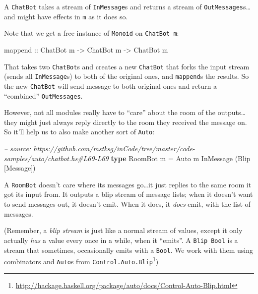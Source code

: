 \documentclass[]{article}
\newenvironment{Shaded}{\begin{snugshade}}{\end{snugshade}}
\newcommand{\CommentTok}[1]{\textcolor[rgb]{0.56,0.35,0.01}{\textit{#1}}}
\newcommand{\DataTypeTok}[1]{\textcolor[rgb]{0.13,0.29,0.53}{#1}}
\newcommand{\FunctionTok}[1]{\textcolor[rgb]{0.00,0.00,0.00}{#1}}
\newcommand{\KeywordTok}[1]{\textcolor[rgb]{0.13,0.29,0.53}{\textbf{#1}}}
\newcommand{\NormalTok}[1]{#1}
\newcommand{\OtherTok}[1]{\textcolor[rgb]{0.56,0.35,0.01}{#1}}
\renewcommand{\href}[2]{#2\footnote{\url{#1}}}
\begin{document}
A \texttt{ChatBot} takes a stream of \texttt{InMessage}s and returns a stream of
\texttt{OutMessages}s\ldots{}and might have effects in \texttt{m} as it does so.

Note that we get a free instance of \texttt{Monoid} on \texttt{ChatBot\ m}:

\begin{Shaded}
\begin{Highlighting}[]
\NormalTok{mappend}\OtherTok{ ::} \DataTypeTok{ChatBot}\NormalTok{ m }\OtherTok{->} \DataTypeTok{ChatBot}\NormalTok{ m }\OtherTok{->} \DataTypeTok{ChatBot}\NormalTok{ m}
\end{Highlighting}
\end{Shaded}

That takes two \texttt{ChatBot}s and creates a new \texttt{ChatBot} that forks
the input stream (sends all \texttt{InMessage}s) to both of the original ones,
and \texttt{mappend}s the results. So the new \texttt{ChatBot} will send message
to both original ones and return a ``combined'' \texttt{OutMessages}.

However, not all modules really have to ``care'' about the room of the
outputs\ldots{}they might just always reply directly to the room they received
the message on. So it'll help us to also make another sort of \texttt{Auto}:

\begin{Shaded}
\begin{Highlighting}[]
\CommentTok{-- source: https://github.com/mstksg/inCode/tree/master/code-samples/auto/chatbot.hs#L69-L69}
\KeywordTok{type} \DataTypeTok{RoomBot}\NormalTok{ m }\FunctionTok{=} \DataTypeTok{Auto}\NormalTok{ m }\DataTypeTok{InMessage}\NormalTok{ (}\DataTypeTok{Blip}\NormalTok{ [}\DataTypeTok{Message}\NormalTok{])}
\end{Highlighting}
\end{Shaded}

A \texttt{RoomBot} doesn't care where its messages go\ldots{}it just replies to
the same room it got its input from. It outputs a blip stream of message lists;
when it doesn't want to send messages out, it doesn't emit. When it does, it
\emph{does} emit, with the list of messages.

(Remember, a \emph{blip stream} is just like a normal stream of values, except
it only actually \emph{has} a value every once in a while, when it ``emits''. A
\texttt{Blip\ Bool} is a stream that sometimes, occasionally emits with a
\texttt{Bool}. We work with them using combinators and \texttt{Auto}s from
\href{http://hackage.haskell.org/package/auto/docs/Control-Auto-Blip.html}{\texttt{Control.Auto.Blip}})
\end{document}
